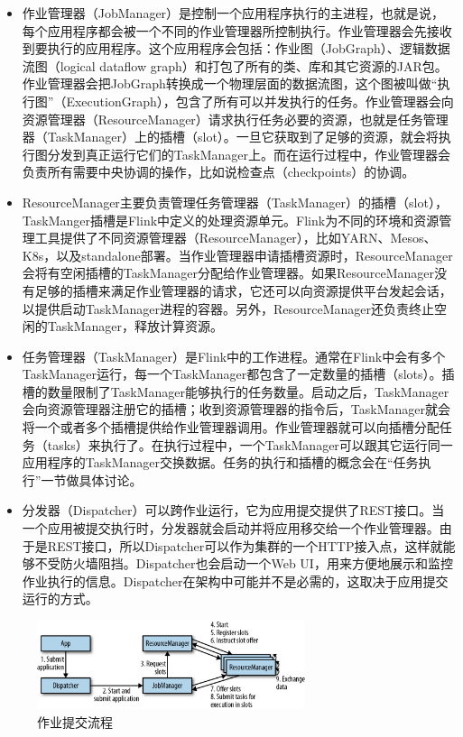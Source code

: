 \documentclass[cn,11pt,chinese]{elegantbook}
\begin{document}
\begin{itemize}
    \item 作业管理器（JobManager）是控制一个应用程序执行的主进程，也就是说，每个应用程序都会被一个不同的作业管理器所控制执行。作业管理器会先接收到要执行的应用程序。这个应用程序会包括：作业图（JobGraph）、逻辑数据流图（logical dataflow graph）和打包了所有的类、库和其它资源的JAR包。作业管理器会把JobGraph转换成一个物理层面的数据流图，这个图被叫做“执行图”（ExecutionGraph），包含了所有可以并发执行的任务。作业管理器会向资源管理器（ResourceManager）请求执行任务必要的资源，也就是任务管理器（TaskManager）上的插槽（slot）。一旦它获取到了足够的资源，就会将执行图分发到真正运行它们的TaskManager上。而在运行过程中，作业管理器会负责所有需要中央协调的操作，比如说检查点（checkpoints）的协调。
    \item ResourceManager主要负责管理任务管理器（TaskManager）的插槽（slot），TaskManger插槽是Flink中定义的处理资源单元。Flink为不同的环境和资源管理工具提供了不同资源管理器（ResourceManager），比如YARN、Mesos、K8s，以及standalone部署。当作业管理器申请插槽资源时，ResourceManager会将有空闲插槽的TaskManager分配给作业管理器。如果ResourceManager没有足够的插槽来满足作业管理器的请求，它还可以向资源提供平台发起会话，以提供启动TaskManager进程的容器。另外，ResourceManager还负责终止空闲的TaskManager，释放计算资源。
    \item 任务管理器（TaskManager）是Flink中的工作进程。通常在Flink中会有多个TaskManager运行，每一个TaskManager都包含了一定数量的插槽（slots）。插槽的数量限制了TaskManager能够执行的任务数量。启动之后，TaskManager会向资源管理器注册它的插槽；收到资源管理器的指令后，TaskManager就会将一个或者多个插槽提供给作业管理器调用。作业管理器就可以向插槽分配任务（tasks）来执行了。在执行过程中，一个TaskManager可以跟其它运行同一应用程序的TaskManager交换数据。任务的执行和插槽的概念会在“任务执行”一节做具体讨论。
    \item 分发器（Dispatcher）可以跨作业运行，它为应用提交提供了REST接口。当一个应用被提交执行时，分发器就会启动并将应用移交给一个作业管理器。由于是REST接口，所以Dispatcher可以作为集群的一个HTTP接入点，这样就能够不受防火墙阻挡。Dispatcher也会启动一个Web UI，用来方便地展示和监控作业执行的信息。Dispatcher在架构中可能并不是必需的，这取决于应用提交运行的方式。
\end{itemize}

\begin{figure}[htbp]
    \centering
    \includegraphics[width=0.7\textwidth]{images/spaf_0301.png}
    \caption{作业提交流程}
\end{figure}
\end{document}
